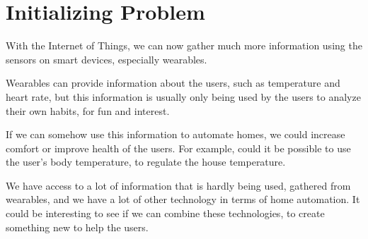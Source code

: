 \section{Initializing Problem}
With the Internet of Things, 
we can now gather much more information using the sensors on smart devices, especially wearables. 

Wearables can provide information about the users,
such as temperature and heart rate, 
but this information is usually only being used by the users to analyze their own habits, 
for fun and interest. 

If we can somehow use this information to automate homes, 
we could increase comfort or improve health of the users. 
For example, could it be possible to use the user's body temperature, 
to regulate the house temperature.

We have access to a lot of information that is hardly being used, 
gathered from \eg wearables,
and we have a lot of other technology in terms of home automation.
It could be interesting to see if we can combine these technologies, 
to create something new to help the users.  
